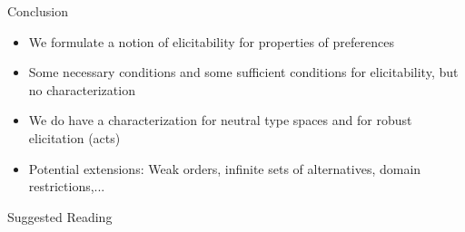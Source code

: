 
%
%
%
%
%
%


\begin{frame}{Conclusion}{}


\begin{itemize}
\item We formulate a notion of elicitability for properties of preferences

\bigskip

\item Some necessary conditions and some sufficient conditions for elicitability, but no characterization

\bigskip

\item We do have a characterization for neutral type spaces and for robust elicitation (acts)

\bigskip

\item Potential extensions: Weak orders, infinite sets of alternatives, domain restrictions,...

\end{itemize}

\end{frame}





\nocite{}

\begin{frame}[allowframebreaks]{Suggested Reading}
    
\end{frame}



